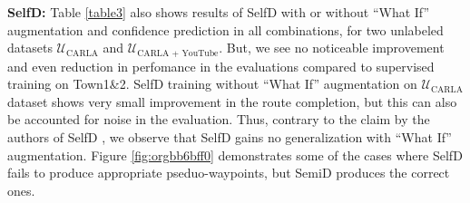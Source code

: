 \documentclass[letterpaper, 12pt]{book}
\theoremstyle{definition}
\theoremstyle{definition}
\theoremstyle{definition}
\theoremstyle{definition}
\theoremstyle{definition}
\begin{document}
\textbf{SelfD:} Table \ref{table3} also shows results of SelfD with or without ``What If''
augmentation and confidence prediction in all combinations, for two unlabeled
datasets \(\mathcal{U}_{\text{CARLA}}\) and \(\mathcal{U}_{\text{CARLA + YouTube}}\). But, we see no
noticeable improvement and even reduction in perfomance in the evaluations
compared to supervised training on Town1\&2. SelfD training without ``What If''
augmentation on \(\mathcal{U}_{\text{CARLA}}\) dataset shows very small improvement in the
route completion, but this can also be accounted for noise in the
evaluation. Thus, contrary to the claim by the authors of SelfD
\cite{Zhang2022a}, we observe that SelfD gains no generalization with ``What
If'' augmentation. Figure \ref{fig:orgbb6bff0} demonstrates some of the cases where
SelfD fails to produce appropriate pseduo-waypoints, but SemiD produces the
correct ones.
\end{document}
